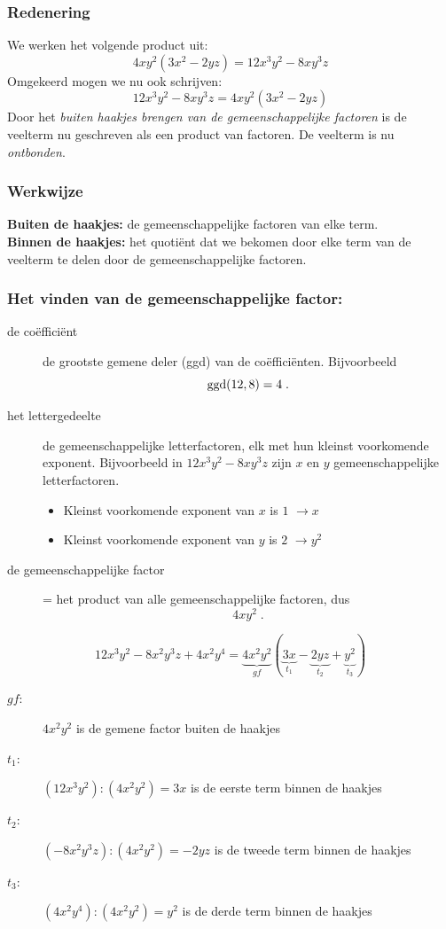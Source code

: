 \documentclass{bis}
\begin{document}
\subsubsection{Redenering}
  We werken het volgende product uit:
\[4xy^2(3x^2 - 2yz) = 12x^3y^2 - 8xy^3z\]
Omgekeerd mogen we nu ook schrijven:
\[12x^3y^2 - 8xy^3z = 4xy^2(3x^2 - 2yz)\]
Door het {\em buiten haakjes brengen van de gemeenschappelijke factoren} is de veelterm nu geschreven als een product van factoren. De veelterm is nu {\em ontbonden}.

\subsubsection{Werkwijze}
  
{\bf Buiten de haakjes:} de gemeenschappelijke factoren van elke term.\\
{\bf Binnen de haakjes:} het quotiënt dat we bekomen door elke term van de veelterm te delen door de gemeenschappelijke factoren.

\subsubsection*{Het vinden van de gemeenschappelijke factor:}
\begin{description}
  \item[de coëfficiënt] de grootste gemene deler (ggd) van de coëfficiënten. Bijvoorbeeld
  \[\ggd(12,8)=4\;.\]
  \item[het lettergedeelte] de gemeenschappelijke letterfactoren, elk met hun kleinst voorkomende exponent. Bijvoorbeeld in $12x^3y^2 - 8xy^3z$ zijn $x$ en $y$ gemeenschappelijke letterfactoren.
  \begin{itemize}
    \item Kleinst voorkomende exponent van $x$ is $1$ $\rightarrow x$
    \item Kleinst voorkomende exponent van $y$ is $2$ $\rightarrow y^2$
  \end{itemize}
  \item[de gemeenschappelijke factor] = het product van alle gemeenschappelijke factoren, dus
  \[4xy^2\;.\]
\end{description}

\begin{voorbeeld}
\[12x^3y^2 - 8x^2y^3z + 4x^2y^4 = \underbrace{4x^2y^2}_{gf} (\underbrace{3x}_{t_1} - \underbrace{2yz}_{t_2} + \underbrace{y^2}_{t_3})\]
\begin{description}
  \item[$gf$:] $4x^2y^2$ is de gemene factor buiten de haakjes
  \item[$t_1$:] $(12x^3y^2):(4x^2y^2)=3x$ is de eerste term binnen de haakjes
  \item[$t_2$:] $(-8x^2y^3z):(4x^2y^2)=-2yz$ is de tweede term binnen de haakjes
  \item[$t_3$:] $(4x^2y^4):(4x^2y^2)=y^2$ is de derde term binnen de haakjes
\end{description}
\end{voorbeeld}
\end{document}
